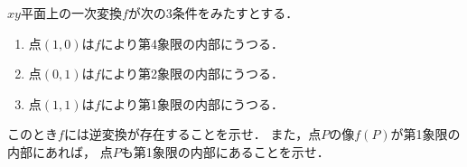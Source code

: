 \documentclass[../../main.tex]{subfiles}
\begin{document}
$xy$平面上の一次変換$f$が次の3条件をみたすとする．
\begin{enumerate}
  \item 点$(1,0)$は$f$により第4象限の内部にうつる．
  \item 点$(0,1)$は$f$により第2象限の内部にうつる．
  \item 点$(1,1)$は$f$により第1象限の内部にうつる．
\end{enumerate}
このとき$f$には逆変換が存在することを示せ．
また，点$P$の像$f(P)$が第1象限の内部にあれば，
点$P$も第1象限の内部にあることを示せ．
\end{document}
